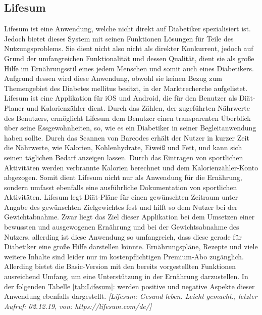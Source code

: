 \documentclass[a4paper,11pt]{article}%
\renewcommand{\\}{\vspace*{0.5\baselineskip} \newline}
\begin{document}
	\subsection{Lifesum}
	Lifesum ist eine Anwendung, welche nicht direkt auf Diabetiker spezialisiert ist. Jedoch bietet dieses System mit seinen Funktionen Lösungen für Teile des Nutzungsproblems. Sie dient nicht also nicht als direkter Konkurrent, jedoch auf Grund der umfangreichen Funktionalität und dessen Qualität, dient sie als große Hilfe im Ernährungsstil eines jedem Menschen und somit auch eines Diabetikers. Aufgrund dessen wird diese Anwendung, obwohl sie keinen Bezug zum Themengebiet des Diabetes mellitus besitzt, in der Marktrecherche aufgelistet. Lifesum ist eine Applikation für iOS und Android, die für den Benutzer als Diät-Planer und Kalorienzähler dient. Durch das Zählen, der zugeführten Nährwerte des Benutzers, ermöglicht Lifesum dem Benutzer einen transparenten Überblick über seine Essgewohnheiten, so, wie es ein Diabetiker in seiner Begleitanwendung haben sollte. Durch das Scannen von Barcodes erhält der Nutzer in kurzer Zeit die Nährwerte, wie Kalorien, Kohlenhydrate, Eiweiß und Fett, und kann sich seinen täglichen Bedarf anzeigen lassen. Durch das Eintragen von sportlichen Aktivitäten werden verbrannte Kalorien berechnet und dem Kalorienzähler-Konto abgezogen. Somit dient Lifesum nicht nur als Anwendung für die Ernährung, sondern umfasst ebenfalls eine ausführliche Dokumentation von sportlichen Aktivitäten. Lifesum legt Diät-Pläne für einen gewünschten Zeitraum unter Angabe des gewünschten Zielgewichtes fest und hilft so dem Nutzer bei der Gewichtabnahme. Zwar liegt das Ziel dieser Applikation bei dem Umsetzen einer bewussten und ausgewogenen Ernährung und bei der Gewichtsabnahme des Nutzers, allerding ist diese Anwendung so umfangreich, dass diese gerade für Diabetiker eine große Hilfe darstellen könnte. Ernährungspläne, Rezepte und viele weitere Inhalte sind leider nur im kostenpflichtigen Premium-Abo zugänglich. Allerding bietet die Basic-Version mit den bereits vorgestellten Funktionen ausreichend Umfang, um eine Unterstützung in der Ernährung darzustellen. In der folgenden Tabelle  \ref{tab:Lifesum}:  werden positive und negative Aspekte dieser Anwendung ebenfalls dargestellt. \emph{[Lifesum: Gesund leben. Leicht gemacht., letzter Aufruf: 02.12.19, von: https://lifesum.com/de/]}
\end{document}

